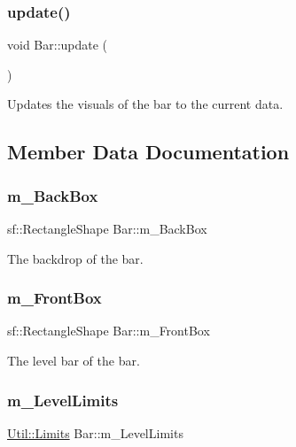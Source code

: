 \subsubsection{\texorpdfstring{update()}{update()}}
{\footnotesize\ttfamily void Bar\+::update (\begin{DoxyParamCaption}{ }\end{DoxyParamCaption})}



Updates the visuals of the bar to the current data. 



\subsection{Member Data Documentation}
\mbox{\label{class_bar_a8c71afcd6b5c23074533c9e7e594022e}} 
\subsubsection{\texorpdfstring{m\+\_\+\+Back\+Box}{m\_BackBox}}
{\footnotesize\ttfamily sf\+::\+Rectangle\+Shape Bar\+::m\+\_\+\+Back\+Box\hspace{0.3cm}{\ttfamily [private]}}



The backdrop of the bar. 

\mbox{\label{class_bar_abe5021e0743bd0ee58fad027b3f1d4c4}} 
\subsubsection{\texorpdfstring{m\+\_\+\+Front\+Box}{m\_FrontBox}}
{\footnotesize\ttfamily sf\+::\+Rectangle\+Shape Bar\+::m\+\_\+\+Front\+Box\hspace{0.3cm}{\ttfamily [private]}}



The level bar of the bar. 

\mbox{\label{class_bar_a7977e8ba5b5c42c70a79aadb8474c3d7}} 
\subsubsection{\texorpdfstring{m\+\_\+\+Level\+Limits}{m\_LevelLimits}}
{\footnotesize\ttfamily \hyperlink{struct_util_1_1_limits}{Util\+::\+Limits} Bar\+::m\+\_\+\+Level\+Limits\hspace{0.3cm}{\ttfamily [private]}}



